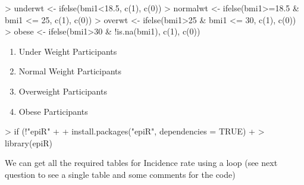 \documentclass{article}
\begin{document}
\begin{Schunk}
\begin{Sinput}
> underwt <- ifelse(bmi1<18.5, c(1), c(0)) 
> normalwt <- ifelse(bmi1>=18.5 & bmi1 <= 25, c(1), c(0))
> overwt <- ifelse(bmi1>25 & bmi1 <= 30, c(1), c(0))
> obese <- ifelse(bmi1>30 & !is.na(bmi1), c(1), c(0))
\end{Sinput}
\end{Schunk}


\begin{enumerate}
  \item 
Under Weight Participants
\item 
Normal Weight Participants
\item 
Overweight Participants
\item
Obese Participants
\end{enumerate}

\begin{Schunk}
\begin{Sinput}
> if (!"epiR" %in% installed.packages())
+ {
+   install.packages("epiR", dependencies = TRUE)
+ }
> library(epiR)
\end{Sinput}
\end{Schunk}
We can get all the required tables for Incidence rate using a loop (see next question to see a single table and some comments for the code)
\end{document}

